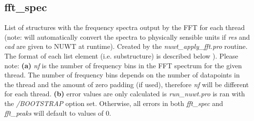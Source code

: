 \documentclass{article}
\begin{document}
\subsection{fft\_spec}
List of structures with the frequency spectra output by the FFT for each thread (note: will automatically convert the spectra to physically sensible units if \textit{res} and \textit{cad} are given to NUWT at runtime). Created by the \textit{nuwt\_apply\_fft.pro} routine. The format of each list element (i.e. substructure) is described below ). Please note: \textbf{(a)} \textit{nf} is the number of frequency bins in the FFT spectrum for the given thread. The number of frequency bins depends on the number of datapoints in the thread and the amount of zero padding (if used), therefore \textit{nf} will be different for each thread. \textbf{(b)} error values are only calculated is \textit{run\_nuwt.pro} is ran with the \textit{/BOOTSTRAP} option set. Otherwise, all errors in both \textit{fft\_spec} and \textit{fft\_peaks} will default to values of 0. 
\end{document}
